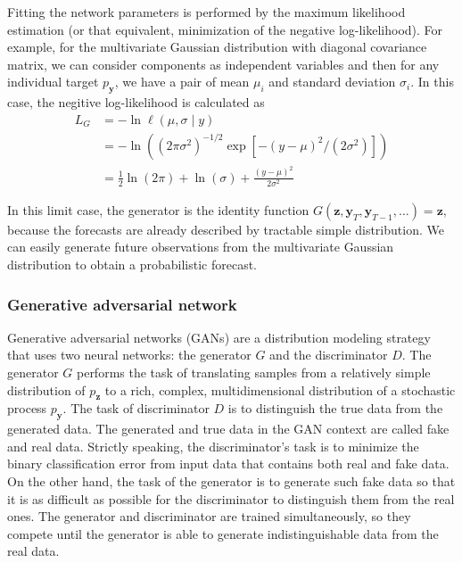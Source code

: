\documentclass[12pt,a4paper]{article}
\begin{document}
Fitting the network parameters is performed by the maximum likelihood estimation (or that equivalent, minimization of the negative log-likelihood). For example, for the multivariate Gaussian distribution with diagonal covariance matrix, we can consider components as independent variables and then for any individual target $p_\mathbf y$, we have a pair of mean $\mu_i$ and standard deviation $\sigma_i$. In this case, the negitive log-likelihood is calculated as
$$\begin{aligned}
L_{G} &=-\ln \ell(\mu, \sigma \mid y) \\
&=-\ln \left(\left(2 \pi \sigma^{2}\right)^{-1 / 2} \exp \left[-(y-\mu)^{2} /\left(2 \sigma^{2}\right)\right]\right) \\
&=\frac{1}{2} \ln (2 \pi)+\ln (\sigma)+\frac{(y-\mu)^{2}}{2 \sigma^{2}}
\end{aligned}$$

In this limit case, the generator is the identity function $G(\mathbf z, \mathbf y_{T}, \mathbf y_{T-1}, \dots) = \mathbf z$, because the forecasts are already described by tractable simple distribution. We can easily generate future observations from the multivariate Gaussian distribution to obtain a probabilistic forecast.

\subsubsection{Generative adversarial network}\label{gan}

Generative adversarial networks (GANs) are a distribution modeling strategy that uses two neural networks: the generator $G$ and the discriminator $D$. The generator $G$ performs the task of translating samples from a relatively simple distribution of $p_\mathbf z$ to a rich, complex, multidimensional distribution of a stochastic process $p_\mathbf y$. The task of discriminator $D$ is to distinguish the true data from the generated data. The generated and true data in the GAN context are called fake and real data. Strictly speaking, the discriminator's task is to minimize the binary classification error from input data that contains both real and fake data. On the other hand, the task of the generator is to generate such fake data so that it is as difficult as possible for the discriminator to distinguish them from the real ones. The generator and discriminator are trained simultaneously, so they compete until the generator is able to generate indistinguishable data from the real data.
\end{document}
